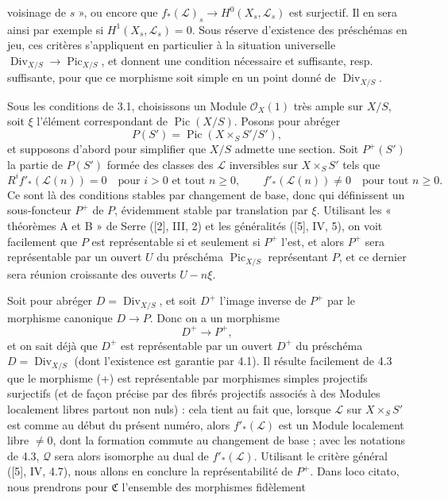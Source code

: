 voisinage de $s$ », ou encore que
$f_*(\mathcal L)_s\longrightarrow H^0(X_s,\mathcal L_s)$ est surjectif. Il en
sera ainsi par exemple si $H^1(X_s,\mathcal L_s)=0$. Sous réserve d'existence
des préschémas en jeu, ces critères s'appliquent en particulier à la situation
universelle $\operatorname{Div}_{X/S}\longrightarrow\operatorname{Pic}_{X/S}$,
et donnent une condition nécessaire et suffisante, resp. suffisante, pour que
ce morphisme soit simple en un point donné de $\operatorname{Div}_{X/S}$.


Sous les conditions de 3.1, choisissons un Module $\mathcal O_X(1)$ très ample
sur $X/S$, soit $\xi$ l'élément correspondant de
$\operatorname{Pic}(X/S)$. Posons pour abréger
\[
P(S')=\operatorname{Pic}(X\times_SS'/S'),
\]
et supposons d'abord pour simplifier que $X/S$ admette une section. Soit
$P^+(S')$ la partie de $P(S')$ formée des classes des $\mathcal L$ inversibles
sur $X\times_SS'$ tels que
\[
R^if'_*(\mathcal L(n))=0\quad\text{pour $i>0$ et tout $n\geq0$},
\qquad
f'_*(\mathcal L(n))\neq0\quad\text{pour tout $n\geq0$}.
\]
Ce sont là des conditions stables par changement de base, donc qui définissent
un sous-foncteur $P^+$ de $P$, évidemment stable par translation par $\xi$.
Utilisant les « théorèmes A et B » de Serre ([2], III, 2) et les généralités
([5], IV, 5), on voit facilement que $P$ est représentable si et seulement si
$P^+$ l'est, et alors $P^+$ sera représentable par un ouvert $U$ du préschéma
$\operatorname{Pic}_{X/S}$ représentant $P$, et ce dernier sera réunion
croissante des ouverts $U-n\xi$.

Soit pour abréger $D=\operatorname{Div}_{X/S}$, et soit $D^+$ l'image inverse
de $P^+$ par le morphisme canonique $D\longrightarrow P$. Donc on a un
morphisme
\begin{equation}
D^+\longrightarrow P^+,
\tag{+}
\end{equation}
et on sait déjà que $D^+$ est représentable par un ouvert $D^+$ du préschéma
$D=\operatorname{Div}_{X/S}$ (dont l'existence est garantie par 4.1). Il
résulte facilement de 4.3 que le morphisme (+) est représentable par morphismes
simples projectifs surjectifs (et de façon précise par des fibrés projectifs
associés à des Modules localement libres partout non nuls) : cela tient au fait
que, lorsque $\mathcal L$ sur $X\times_SS'$ est comme au début du présent
numéro, alors $f'_*(\mathcal L)$ est un Module localement libre $\neq0$, dont la
formation commute au changement de base ; avec les notations de 4.3,
$\mathcal Q$ sera alors isomorphe au dual de $f'_*(\mathcal L)$. Utilisant le
critère général ([5], IV, 4.7), nous allons en conclure la représentabilité de
$P^+$. Dans loco citato, nous prendrons pour $\mathfrak C$ l'ensemble des
morphismes fidèlement

